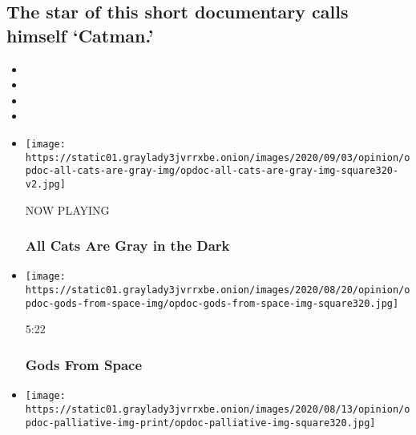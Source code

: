 \hypertarget{the-star-of-this-short-documentary-calls-himself-catman-1}{%
\subsection{The star of this short documentary calls himself
`Catman.'}\label{the-star-of-this-short-documentary-calls-himself-catman-1}}

\begin{itemize}
\item
\item
\item
\item
\end{itemize}

\begin{itemize}
\item
  \texttt{[image: https://static01.graylady3jvrrxbe.onion/images/2020/09/03/opinion/opdoc-all-cats-are-gray-img/opdoc-all-cats-are-gray-img-square320-v2.jpg]}

  NOW PLAYING

  \hypertarget{all-cats-are-gray-in-the-dark-2}{%
  \subsubsection{All Cats Are Gray in the
  Dark}\label{all-cats-are-gray-in-the-dark-2}}
\item
  \href{https://www.nytimes3xbfgragh.onion/video/opinion/100000006831441/gods-from-space.html?action=click\&module=video-series-bar\&region=header\&pgtype=Article\&playlistId=video/op-docs}{}

  \texttt{[image: https://static01.graylady3jvrrxbe.onion/images/2020/08/20/opinion/opdoc-gods-from-space-img/opdoc-gods-from-space-img-square320.jpg]}

  5:22

  \hypertarget{gods-from-space}{%
  \subsubsection{Gods From Space}\label{gods-from-space}}
\item
  \href{https://www.nytimes3xbfgragh.onion/video/opinion/100000007249913/dying-in-your-mothers-arms.html?action=click\&module=video-series-bar\&region=header\&pgtype=Article\&playlistId=video/op-docs}{}

  \texttt{[image: https://static01.graylady3jvrrxbe.onion/images/2020/08/13/opinion/opdoc-palliative-img-print/opdoc-palliative-img-square320.jpg]}


\end{itemize}
